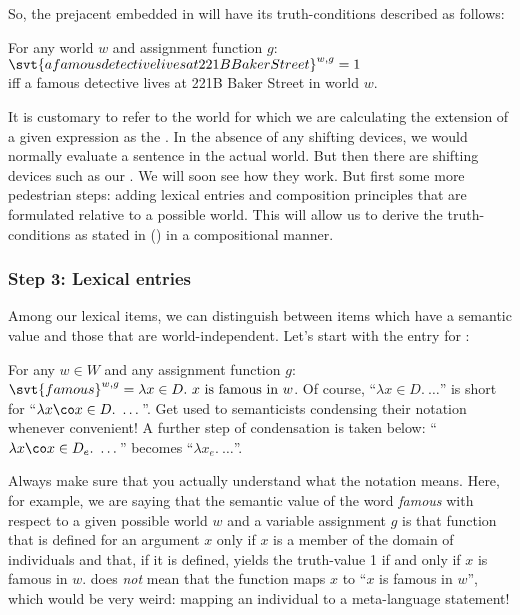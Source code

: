 \clearpage
{}%
So, the prejacent embedded in  will have its truth-conditions
described as follows:

\ex For any world \(w\) and assignment function \(g\):\\
$\svt{a famous detective lives at 221B Baker Street}^{w,g} = 1$\\
iff a famous detective lives at 221B Baker Street in world $w$. \xe

It is customary to refer to the world for which we are calculating the extension
of a given expression as the . In the absence of any
shifting devices, we would normally evaluate a sentence in the actual world. But
then there are shifting devices such as our . We will soon see how they work. But first some more pedestrian steps:
adding lexical entries and composition principles that are formulated relative
to a possible world. This will allow us to derive the truth-conditions as stated
in (\lastx) in a compositional manner.

\subsubsection{Step 3: Lexical entries} \label{sec:lexical-entries}

Among our lexical items, we can distinguish between items which have a
 semantic value and those that are world-independent.
Let's start with the entry for :

\ex For any $w \in W$ and any assignment function $g$:\\
$\svt{famous}^{w,g} = \lambda x \in D.\ x \mbox{ is famous in }
w$.
\xe
%
Of course, ``$\lambda x \in D.\ \dots$'' is short for
``$\lambda x\co x \in D.\ \dots$''. Get used to semanticists condensing their
notation whenever convenient! A further step of condensation is taken below:
``$\lambda x\co x \in D_e.\ \dots$'' becomes ``$\lambda x_e.\ \dots$''.

Always make sure that you actually understand what the notation means. Here, for
example, we are saying that the semantic value of the word \emph{famous} with
respect to a given possible world $w$ and a variable assignment $g$ is that
function that is defined for an argument $x$ only if $x$ is a member of the
domain of individuals and that, if it is defined, yields the truth-value 1 if
and only if $x$ is famous in $w$. \Last does \emph{not} mean that the
function maps $x$ to ``$x$ is famous in $w$'', which would be very weird:
mapping an individual to a meta-language statement!

